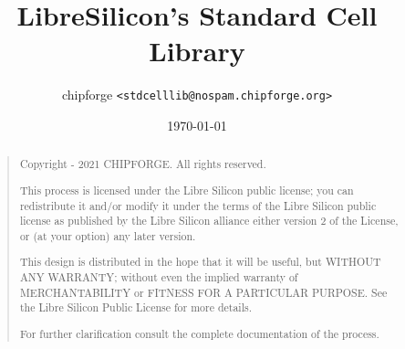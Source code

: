 \documentclass[10pt,a4paper]{report}
\title{LibreSilicon's Standard Cell Library}
\author{chipforge \texttt{<stdcelllib@nospam.chipforge.org>}}
\date{\today}
\begin{document}
\maketitle

\begin{abstract}
\begin{quote}
Copyright  - 2021 CHIPFORGE. All rights reserved.

This process is licensed under the Libre Silicon public license; you can redistribute it and/or modify it under the terms of the Libre Silicon public license as published by the Libre Silicon alliance either version 2 of the License, or (at your option) any later version.

This design is distributed in the hope that it will be useful, but WITHOUT ANY WARRANTY; without even the implied warranty of MERCHANTABILITY or FITNESS FOR A PARTICULAR PURPOSE. See the Libre Silicon Public License for more details.

For further clarification consult the complete documentation of the process.
\end{quote}
\end{abstract}


\tableofcontents












\end{document}
